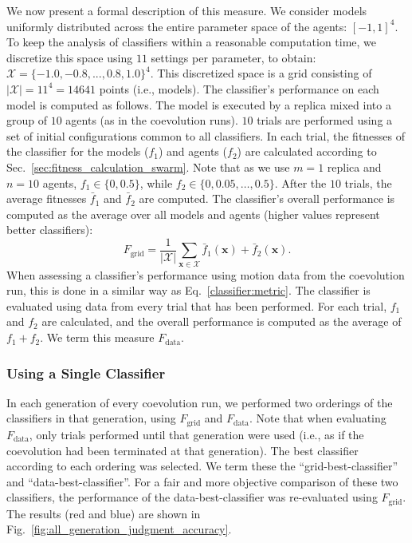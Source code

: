 We now present a formal description of this measure. We consider models uniformly distributed across the entire parameter space of the agents: $[-1,1]^4$. To keep the analysis of classifiers within a reasonable computation time, we discretize this space using $11$ settings per parameter, to obtain: $\mathcal{X} = \{-1.0, -0.8, ..., 0.8, 1.0\}^4$. This discretized space is a grid consisting of $|\mathcal{X}|=11^4=14641$ points (i.e., models). The classifier's performance on each model is computed as follows. The model is executed by a replica mixed into a group of $10$ agents (as in the coevolution runs). $10$ trials are performed using a set of initial configurations common to all classifiers. In each trial, the fitnesses of the classifier for the models ($f_1$) and agents ($f_2$) are calculated according to Sec.~\ref{sec:fitness_calculation_swarm}. Note that as we use $m=1$ replica and $n=10$ agents, $f_1\in\{0,0.5\}$, while $f_2\in\{0,0.05,\dots,0.5\}$. After the $10$ trials, the average fitnesses $\bar{f}_1$ and $\bar{f}_2$ are computed. The classifier's overall performance is computed as the average over all models and agents (higher values represent better classifiers):
\begin{equation}\label{classifier:metric}
F_{\textrm{grid}}=\frac{1}{|\mathcal{X}|} \sum_{\mathbf{x}\in \mathcal{X}} \bar{f}_1(\mathbf{x}) + \bar{f}_2(\mathbf{x}).
\end{equation}
%
%
When assessing a classifier's performance using motion data from the coevolution run, this is done in a similar way as Eq.~\eqref{classifier:metric}. The classifier is evaluated using data from every trial that has been performed. For each trial, $f_1$ and $f_2$ are calculated, and the overall performance is computed as the average of $f_1 + f_2$. We term this measure $F_\textrm{data}$.

\subsubsection{Using a Single Classifier}
In each generation of every coevolution run, we performed two orderings of the classifiers in that generation, using $F_\textrm{grid}$ and $F_{\textrm{data}}$. Note that when evaluating $F_\textrm{data}$, only trials performed until that generation were used (i.e., as if the coevolution had been terminated at that generation). The best classifier according to each ordering was selected. We term these the ``grid-best-classifier'' and ``data-best-classifier''. For a fair and more objective comparison of these two classifiers, the performance of the data-best-classifier was re-evaluated using $F_\textrm{grid}$. The results (red and blue) are shown in Fig.~\ref{fig:all_generation_judgment_accuracy}.

